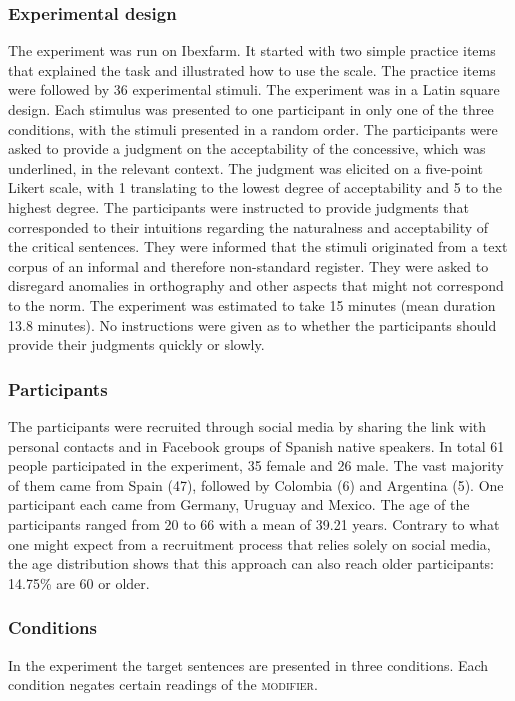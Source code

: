 \subsubsection{Experimental design}
The experiment was run on Ibexfarm. It started with two simple practice items that explained the task and illustrated how to use the scale. The practice items were followed by 36 experimental stimuli. The experiment was in a Latin square design. Each stimulus was presented to one participant in only one of the three conditions, with the stimuli presented in a random order. The participants were asked to provide a judgment on the acceptability of the concessive, which was underlined, in the relevant context. The judgment was elicited on a five-point Likert scale, with 1 translating to the lowest degree of acceptability  and 5 to the highest degree. 
The participants were instructed to provide judgments that corresponded to their intuitions regarding the naturalness and acceptability of the critical sentences. They were informed that the stimuli originated from a text corpus of an informal and therefore non-standard register. They were asked to disregard anomalies in orthography and other aspects that might not correspond to the norm. The  experiment was estimated to take 15 minutes (mean duration 13.8 minutes). No instructions were given as to whether the participants should provide their judgments  quickly or slowly.

\subsubsection{Participants}
The participants were recruited through social media by sharing the link with personal contacts and in Facebook groups of Spanish native speakers. In total 61 people participated in the experiment, 35 female and 26 male. The vast majority of them came from Spain (47), followed by Colombia (6) and Argentina (5). One participant each came from Germany, Uruguay and Mexico. The age of the participants ranged from 20 to 66 with a mean of 39.21 years. Contrary to what one might expect from a recruitment process that relies solely on social media,  the age distribution  shows that this approach can also reach older participants: 14.75\% are 60 or older. 




\subsubsection{Conditions}
In the experiment the target sentences are presented in three conditions. Each condition negates certain readings of the \textsc{modifier}. 

